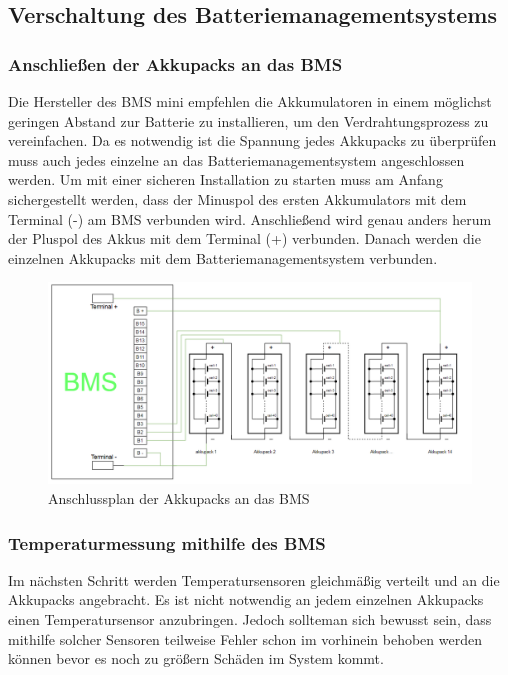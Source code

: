 \subsection{Verschaltung des Batteriemanagementsystems}

\subsubsection{Anschließen der Akkupacks an das BMS}

Die Hersteller des BMS mini empfehlen die Akkumulatoren in einem möglichst geringen Abstand zur Batterie zu installieren, um den Verdrahtungsprozess zu vereinfachen. Da es notwendig ist die Spannung jedes Akkupacks zu überprüfen muss auch jedes einzelne an das Batteriemanagementsystem angeschlossen werden. Um mit einer sicheren Installation zu starten muss am Anfang sichergestellt werden, dass der Minuspol des ersten Akkumulators mit dem Terminal (-) am BMS verbunden wird. Anschließend wird genau anders herum der Pluspol des Akkus mit dem Terminal (+) verbunden. Danach werden die einzelnen Akkupacks mit dem Batteriemanagementsystem verbunden.

\begin{figure}[H]
	\begin{center}
		\includegraphics[angle=90,scale=0.65]{figures/Akku/BMSAkkupacks.PNG}
		\caption{Anschlussplan der Akkupacks an das BMS}
		\label{fig: Anschlussplan der Akkupacks an das BMS}
	\end{center}
\end{figure}

\newpage
\subsubsection{Temperaturmessung mithilfe des BMS}

Im nächsten Schritt werden Temperatursensoren gleichmäßig verteilt und an die Akkupacks angebracht. Es ist nicht notwendig an jedem einzelnen Akkupacks einen Temperatursensor anzubringen. Jedoch sollteman sich bewusst sein, dass mithilfe solcher Sensoren teilweise Fehler schon im vorhinein behoben werden können bevor es noch zu größern Schäden im System kommt.

